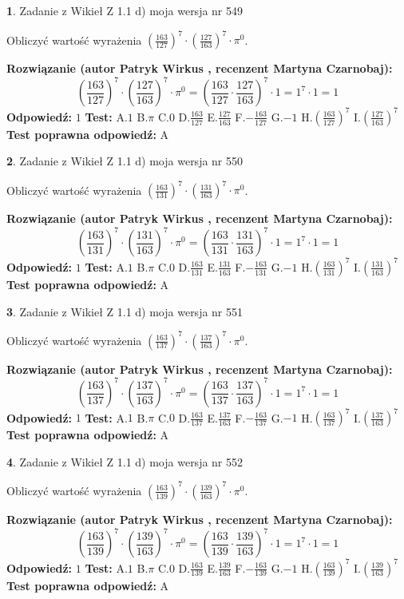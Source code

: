 \documentclass[12pt, a4paper]{article}
\theoremstyle{definition} %
\newtheorem{zad}{}
\newcommand{\zadStart}[1]{\begin{zad}#1\newline}
\newcommand{\zadStop}{\end{zad}}
\newcommand{\rozwStart}[2]{\noindent \textbf{Rozwiązanie (autor #1 , recenzent #2): }\newline}
\newcommand{\rozwStop}{\newline}
\newcommand{\odpStart}{\noindent \textbf{Odpowiedź:}\newline}
\newcommand{\odpStop}{\newline}
\newcommand{\testStart}{\noindent \textbf{Test:}\newline}
\newcommand{\testStop}{\newline}
\newcommand{\kluczStart}{\noindent \textbf{Test poprawna odpowiedź:}\newline}
\newcommand{\kluczStop}{\newline}
\begin{document}
\zadStart{Zadanie z Wikieł Z 1.1 d) moja wersja nr 549}

Obliczyć wartość wyrażenia $(\frac{163}{127})^{7} \cdot (\frac{127}{163})^{7} \cdot \pi^{0}$.
\zadStop
\rozwStart{Patryk Wirkus}{Martyna Czarnobaj}
$$(\frac{163}{127})^{7} \cdot (\frac{127}{163})^{7} \cdot \pi^{0} = (\frac{163}{127} \cdot \frac{127}{163})^{7} \cdot 1 = 1^{7} \cdot 1 = 1$$
\rozwStop
\odpStart
$1$
\odpStop
\testStart
A.$1$ B.$\pi$ C.$0$ D.$\frac{163}{127}$ E.$\frac{127}{163}$
F.$-\frac{163}{127}$ G.$-1$
H.$(\frac{163}{127})^{7}$
I.$(\frac{127}{163})^{7}$
\testStop
\kluczStart
A
\kluczStop



\zadStart{Zadanie z Wikieł Z 1.1 d) moja wersja nr 550}

Obliczyć wartość wyrażenia $(\frac{163}{131})^{7} \cdot (\frac{131}{163})^{7} \cdot \pi^{0}$.
\zadStop
\rozwStart{Patryk Wirkus}{Martyna Czarnobaj}
$$(\frac{163}{131})^{7} \cdot (\frac{131}{163})^{7} \cdot \pi^{0} = (\frac{163}{131} \cdot \frac{131}{163})^{7} \cdot 1 = 1^{7} \cdot 1 = 1$$
\rozwStop
\odpStart
$1$
\odpStop
\testStart
A.$1$ B.$\pi$ C.$0$ D.$\frac{163}{131}$ E.$\frac{131}{163}$
F.$-\frac{163}{131}$ G.$-1$
H.$(\frac{163}{131})^{7}$
I.$(\frac{131}{163})^{7}$
\testStop
\kluczStart
A
\kluczStop



\zadStart{Zadanie z Wikieł Z 1.1 d) moja wersja nr 551}

Obliczyć wartość wyrażenia $(\frac{163}{137})^{7} \cdot (\frac{137}{163})^{7} \cdot \pi^{0}$.
\zadStop
\rozwStart{Patryk Wirkus}{Martyna Czarnobaj}
$$(\frac{163}{137})^{7} \cdot (\frac{137}{163})^{7} \cdot \pi^{0} = (\frac{163}{137} \cdot \frac{137}{163})^{7} \cdot 1 = 1^{7} \cdot 1 = 1$$
\rozwStop
\odpStart
$1$
\odpStop
\testStart
A.$1$ B.$\pi$ C.$0$ D.$\frac{163}{137}$ E.$\frac{137}{163}$
F.$-\frac{163}{137}$ G.$-1$
H.$(\frac{163}{137})^{7}$
I.$(\frac{137}{163})^{7}$
\testStop
\kluczStart
A
\kluczStop



\zadStart{Zadanie z Wikieł Z 1.1 d) moja wersja nr 552}

Obliczyć wartość wyrażenia $(\frac{163}{139})^{7} \cdot (\frac{139}{163})^{7} \cdot \pi^{0}$.
\zadStop
\rozwStart{Patryk Wirkus}{Martyna Czarnobaj}
$$(\frac{163}{139})^{7} \cdot (\frac{139}{163})^{7} \cdot \pi^{0} = (\frac{163}{139} \cdot \frac{139}{163})^{7} \cdot 1 = 1^{7} \cdot 1 = 1$$
\rozwStop
\odpStart
$1$
\odpStop
\testStart
A.$1$ B.$\pi$ C.$0$ D.$\frac{163}{139}$ E.$\frac{139}{163}$
F.$-\frac{163}{139}$ G.$-1$
H.$(\frac{163}{139})^{7}$
I.$(\frac{139}{163})^{7}$
\testStop
\kluczStart
A
\kluczStop
\end{document}
